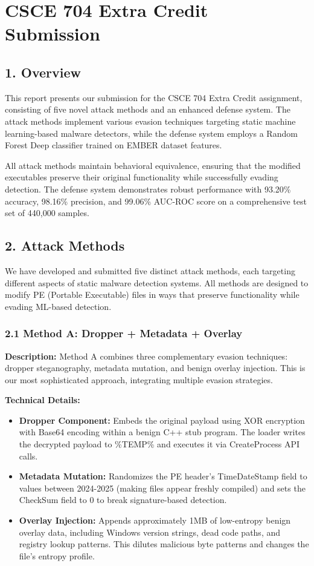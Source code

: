 \documentclass[12pt,letterpaper]{article}
\begin{document}
\section*{CSCE 704 Extra Credit Submission}

\subsection*{1. Overview}

This report presents our submission for the CSCE 704 Extra Credit assignment, consisting of five novel attack methods and an enhanced defense system. The attack methods implement various evasion techniques targeting static machine learning-based malware detectors, while the defense system employs a Random Forest Deep classifier trained on EMBER dataset features.

All attack methods maintain behavioral equivalence, ensuring that the modified executables preserve their original functionality while successfully evading detection. The defense system demonstrates robust performance with 93.20\% accuracy, 98.16\% precision, and 99.06\% AUC-ROC score on a comprehensive test set of 440,000 samples.

\subsection*{2. Attack Methods}

We have developed and submitted five distinct attack methods, each targeting different aspects of static malware detection systems. All methods are designed to modify PE (Portable Executable) files in ways that preserve functionality while evading ML-based detection.

\subsubsection*{2.1 Method A: Dropper + Metadata + Overlay}

\textbf{Description:} Method A combines three complementary evasion techniques: dropper steganography, metadata mutation, and benign overlay injection. This is our most sophisticated approach, integrating multiple evasion strategies.

\textbf{Technical Details:}
\begin{itemize}
    \item \textbf{Dropper Component:} Embeds the original payload using XOR encryption with Base64 encoding within a benign C++ stub program. The loader writes the decrypted payload to \%TEMP\% and executes it via CreateProcess API calls.
    \item \textbf{Metadata Mutation:} Randomizes the PE header's TimeDateStamp field to values between 2024-2025 (making files appear freshly compiled) and sets the CheckSum field to 0 to break signature-based detection.
    \item \textbf{Overlay Injection:} Appends approximately 1MB of low-entropy benign overlay data, including Windows version strings, dead code paths, and registry lookup patterns. This dilutes malicious byte patterns and changes the file's entropy profile.
\end{itemize}
\end{document}
